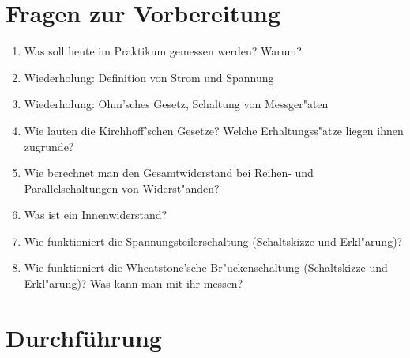 \section{Fragen zur Vorbereitung}

\begin{enumerate}
 \item Was soll heute im Praktikum gemessen werden? Warum?
 \item Wiederholung: Definition von Strom und Spannung
 \item Wiederholung: Ohm'sches Gesetz, Schaltung von Messger"aten
 \item Wie lauten die Kirchhoff'schen Gesetze? Welche Erhaltungss"atze liegen ihnen zugrunde?
 \item Wie berechnet man den Gesamtwiderstand bei Reihen- und Parallelschaltungen von Widerst"anden?
 \item Was ist ein Innenwiderstand?
 \item Wie funktioniert die Spannungsteilerschaltung (Schaltskizze und Erkl"arung)?
 \item Wie funktioniert die Wheatstone'sche Br"uckenschaltung (Schaltskizze und Erkl"arung)? Was kann man mit ihr messen?
\end{enumerate}

\section{Durchführung} 

